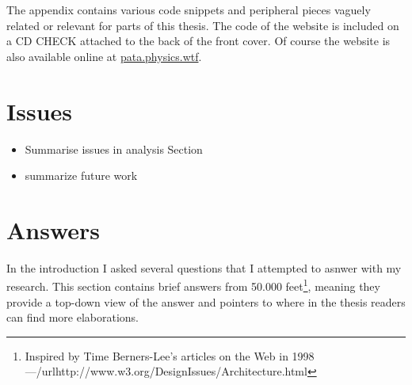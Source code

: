 The appendix contains various code snippets and peripheral pieces vaguely related or relevant for parts of this thesis. The code of the website is included on a CD CHECK attached to the back of the front cover. Of course the website is also available online at \url{pata.physics.wtf}.



\section{Issues}

\begin{itemize}
  \item Summarise issues in analysis Section
  \item summarize future work
\end{itemize}


\section{Answers}
\label{s:answers}

In the introduction I asked several questions that I attempted to asnwer with my research. This section contains brief answers from 50.000 feet\footnote{Inspired by Time Berners-Lee's articles on the Web in 1998---/url{http://www.w3.org/DesignIssues/Architecture.html}}, meaning they provide a top-down view of the answer and pointers to where in the thesis readers can find more elaborations.


